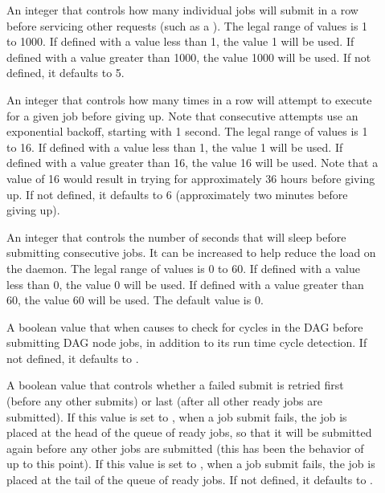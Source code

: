 \begin{description}
\item[]
\label{param:DAGManMaxSubmitsPerInterval}
An integer that controls how many individual jobs
 will submit in a row
before servicing other requests (such as a ).
The legal range of values is 1 to 1000.
If defined with a value less than 1, the  value 1 will be used.
If defined with a value greater than 1000, the value 1000 will be used.
If not defined, it defaults to 5.

\item[]
\label{param:DAGManMaxSubmitAttempts}
An integer that controls how
many times in a row  will attempt to execute
 for a given job before giving up.
Note that consecutive attempts use an exponential backoff,
starting with 1 second.
The legal range of values is 1 to 16.
If defined with a value less than 1, the  value 1 will be used.
If defined with a value greater than 16, the value 16 will be used.
Note that a value of 16 would result in  trying for
approximately 36 hours before giving up.
If not defined,
it defaults to 6 (approximately two minutes before giving up).

\item[]
\label{param:DAGManSubmitDelay}
An integer that controls the number of seconds
that  will sleep before submitting consecutive jobs.
It can be increased to help reduce the load on the  daemon.
The legal range of values is 0 to 60.
If defined with a value less than 0, the  value 0 will be used.
If defined with a value greater than 60, the value 60 will be used.
The default value is 0.

\item[]
\label{param:DAGManStartupCycleDetect}
A boolean value that when 
causes  to check for cycles in the DAG before
submitting DAG node jobs,
in addition to its run time cycle detection.
If not defined, it defaults to .

\item[]
\label{param:DAGManRetrySubmitFirst}
A boolean value that controls whether a failed submit is retried first
(before any other submits) or last (after all other ready jobs are
submitted).  If this value is set to , when a job submit
fails, the job is placed at the head of the queue of ready jobs, so
that it will be submitted again before any other jobs are submitted
(this has been the behavior of  up to this point).
If this value is set to , when a job submit fails, the job
is placed at the tail of the queue of ready jobs.
If not defined, it defaults to .


\end{description}
